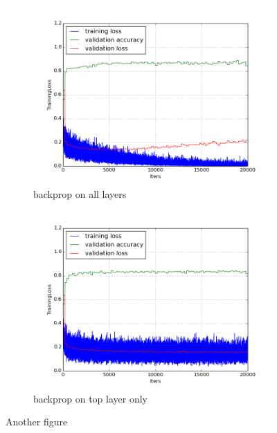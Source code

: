\documentclass[a4paper,11pt]{article}
\begin{document}
\begin{figure}
    \centering
    \begin{minipage}[b]{\textwidth}
      \begin{subfigure}{.5\textwidth} 
        \centering
        \includegraphics[scale=0.4]{images/plot_clampdet_none.png}
        \caption{backprop on all layers}\label{fig:2a}
      \end{subfigure}%
      \begin{subfigure}{.5\textwidth} 
        \centering
        \includegraphics[scale=0.4]{images/plot_clampdet_fc7.png}
        \caption{backprop on top layer only}\label{fig:2b}
      \end{subfigure} \par \vspace*{20pt} %
      \caption{Another figure}\label{fig:2}
    \end{minipage}%
\end{figure}
\end{document}
